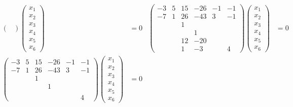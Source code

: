 \documentclass[12pt,a4paper]{article}
\begin{document}
\begin{problem*}
\begin{enumerate}
\begin{align*}
\begin{pmatrix}
                    \end{pmatrix}
                    \begin{pmatrix}
                        x_1\\x_2\\x_3\\x_4\\x_5\\x_6
                    \end{pmatrix}
                    &= 0&
                    \begin{pmatrix}
                        -3& 5& 15& -26& -1& -1\\
                        -7& 1& 26& -43& 3& -1\\
                        & & 1& & & \\
                        & & & 1& & \\
                        & & 12& -20& & \\
                        & & 1& -3& & 4
                    \end{pmatrix}
                    \begin{pmatrix}
                        x_1\\x_2\\x_3\\x_4\\x_5\\x_6
                    \end{pmatrix}
                    &= 0\\
                    \begin{pmatrix}
                        -3& 5& 15& -26& -1& -1\\
                        -7& 1& 26& -43& 3& -1\\
                        & & 1& & & \\
                        & & & 1& & \\
                        & & & & & \\
                        & & & & & 4
                    \end{pmatrix}
                    \begin{pmatrix}
                        x_1\\x_2\\x_3\\x_4\\x_5\\x_6
                    \end{pmatrix}
                    &= 0&

\end{align*}
\end{enumerate}
\end{problem*}
\end{document}
